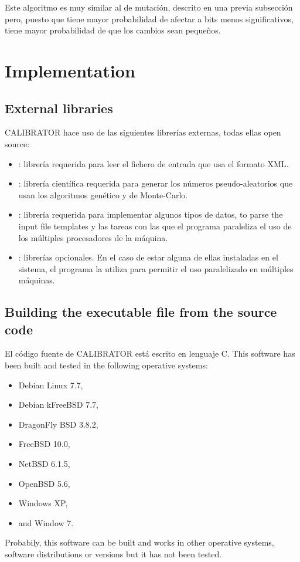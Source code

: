 \documentclass[review,authoryear]{elsarticle}
\begin{document}
Este algoritmo es muy similar al de mutación, descrito en una previa subsección
pero, puesto que tiene mayor probabilidad de afectar a bits menos
significativos, tiene mayor probabilidad de que los cambios sean pequeños.

\section{Implementation}

\subsection{External libraries}

CALIBRATOR hace uso de las siguientes librerías externas, todas ellas open
source:

\begin{itemize}
\item\citet{libxml}: librería requerida para leer el fichero de entrada que usa
	el formato XML.
\item\citet{gsl}: librería científica requerida para generar los números
	pseudo-aleatorios que usan los algoritmos genético y de Monte-Carlo.
\item\citet{glib}: librería requerida para implementar algunos tipos de datos,
	to parse the input file templates y las tareas con las que el programa
	paraleliza el uso de los múltiples procesadores de la máquina.
\item\citet{openmpi,mpich}: librerías opcionales. En el caso de estar alguna de
	ellas instaladas en el sistema, el programa la utiliza para permitir el uso
	paralelizado en múltiples máquinas.
\end{itemize}

\subsection{Building the executable file from the source code}

El código fuente de CALIBRATOR está escrito en lenguaje C. This software has
been built and tested in the following operative systems:
\begin{itemize}
\item Debian Linux 7.7,
\item Debian kFreeBSD 7.7,
\item DragonFly BSD 3.8.2,
\item FreeBSD 10.0,
\item NetBSD 6.1.5,
\item OpenBSD 5.6,
\item Windows XP\footnotemark[1],
\item and Window 7\footnotemark[1].
\end{itemize}
Probabily, this software can be built and works in other operative systems,
software distributions or versions but it has not been tested.
\end{document}
